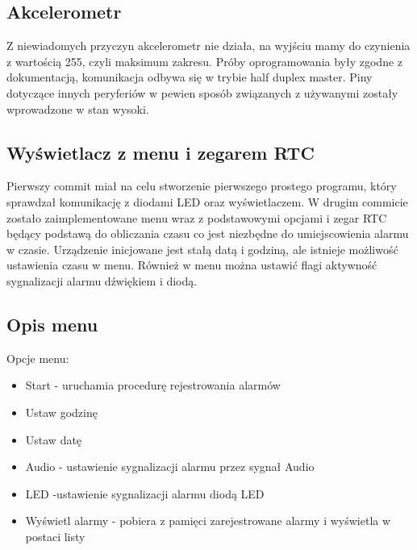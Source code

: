\documentclass[10pt, a4paper]{article}
\begin{document}
\subsection{Akcelerometr}
Z niewiadomych przyczyn akcelerometr nie działa, na wyjściu mamy do czynienia z wartością 255, czyli maksimum zakresu. Próby oprogramowania były zgodne z dokumentacją, komunikacja odbywa się w trybie half duplex master. Piny dotyczące innych peryferiów w pewien sposób związanych z używanymi zostały wprowadzone w stan wysoki.
\subsection{Wyświetlacz z menu i zegarem RTC}
Pierwszy commit miał na celu stworzenie pierwszego prostego programu, który sprawdzał komunikację z diodami LED oraz wyświetlaczem.
W drugim commicie zostało zaimplementowane menu wraz z podstawowymi opcjami i zegar RTC będący podstawą do obliczania czasu co jest niezbędne do umiejscowienia alarmu w czasie. Urządzenie inicjowane jest stałą datą i godziną, ale istnieje możliwość ustawienia czasu w menu. Również w menu można ustawić flagi aktywność sygnalizacji alarmu dźwiękiem i diodą.
\subsection{Opis menu}

Opcje menu:
\begin {itemize}
\item Start - uruchamia procedurę rejestrowania alarmów
\item Ustaw godzinę
\item Ustaw datę
\item Audio - ustawienie sygnalizacji alarmu przez sygnał Audio
\item LED -ustawienie sygnalizacji alarmu diodą LED
\item Wyświetl alarmy - pobiera z pamięci zarejestrowane alarmy i wyświetla w postaci listy

\end {itemize}
\end{document}
